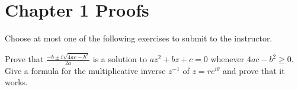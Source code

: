 \documentclass[12pt]{exam}
\begin{document}
%
%
%
%
%
%
%
%

\section*{Chapter 1 Proofs}

Choose at most one of the following exercises to submit to the instructor.

\begin{questions}

\setcounter{question}{10}

\question Prove that \(\frac{-b\pm i\sqrt{4ac-b^2}}{2a}\) is a solution
to \(az^2+bz+c=0\) whenever \(4ac-b^2\geq 0\).
\question Give a formula for the multiplicative inverse \(z^{-1}\) of \(z=re^{i\theta}\)
and prove that it works. 

\end{questions}
\end{document}
